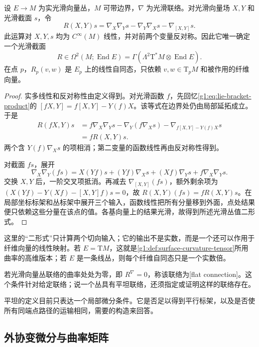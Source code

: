 \begin{proposition}\label{g1:prop:bundle-curvature-tensorial}
	设 \(E\to M\) 为实光滑向量丛，\(M\) 可带边界，\(\nabla\) 为光滑联络。对光滑向量场 \(X,Y\) 和光滑截面 \(s\)，令
	\[
		R(X,Y)s=\nabla_X\nabla_Ys-\nabla_Y\nabla_Xs-\nabla_{[X,Y]}s.
	\]
	此运算对 \(X,Y,s\) 均为 \(C^\infty(M)\) 线性，并对前两个变量反对称。因此它唯一确定一个光滑截面
	\[
		R\in\Omega^2(M;\operatorname{End}E)
		=\Gamma(\Lambda^2\mathrm{T}^*M\otimes\operatorname{End}E).
	\]
	在点 \(p\)，\(R_p(v,w)\) 是 \(E_p\) 上的线性自同态，只依赖 \(v,w\in \mathrm{T}_pM\) 和被作用的纤维向量。
\end{proposition}
\begin{proof}
	实多线性和反对称性由定义得到。对光滑函数 \(f\)，先回忆\eqref{g1:eq:lie-bracket-product}的 \([fX,Y]=f[X,Y]-Y(f)X\)。该等式在边界处仍由局部延拓成立。于是
	\begin{align*}
		R(fX,Y)s
		&=f\nabla_X\nabla_Ys-\nabla_Y(f\nabla_Xs)-\nabla_{f[X,Y]-Y(f)X}s\\
		&=fR(X,Y)s.
	\end{align*}
	两个含 \(Y(f)\nabla_Xs\) 的项相消；第二变量的函数线性再由反对称性得到。

	对截面 \(fs\)，展开
	\[
		\nabla_X\nabla_Y(fs)
		=X(Yf)s+(Yf)\nabla_Xs+(Xf)\nabla_Ys+f\nabla_X\nabla_Ys.
	\]
	交换 \(X,Y\) 后，一阶交叉项抵消。再减去 \(\nabla_{[X,Y]}(fs)\)，额外剩余项为 \((X(Yf)-Y(Xf)-[X,Y]f)s=0\)，故 \(R(X,Y)(fs)=fR(X,Y)s\)。在局部坐标标架和丛标架中展开三个输入，函数线性把所有分量移到外面，点处结果便只依赖这些分量在该点的值。各基向量上的结果光滑，故得到所述光滑丛值二形式。
\end{proof}

这里的“二形式”只计算两个切向输入；它的输出不是实数，而是一个还可以作用于纤维向量的线性映射。若 \(E=\mathrm{T}M\)，这就是\cref{g1:def:surface-curvature-tensor}所用曲率的高维版本；若 \(E\) 是一条线丛，则每个纤维自同态只是一个实数倍。

\begin{definition}\label{g1:def:flat-connection}
	若光滑向量丛联络的曲率处处为零，即 \(R^\nabla=0\)，称该联络为[flat connection]。这个条件针对给定联络；说一个丛具有平坦联络，还须指定或证明这样的联络存在。
\end{definition}

平坦的定义目前只表达一个局部微分条件。它是否足以得到平行标架，以及是否使所有同端点路径的运输相同，需要的构造来回答。

\subsection{外协变微分与曲率矩阵}
\label{g1:subsec:1503:02}


